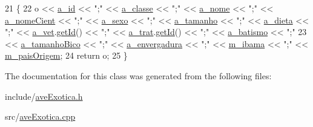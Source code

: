 \begin{DoxyCode}
21 \{
22     o << \hyperlink{classAnimal_a1eab12d1133a739dc0fea720cf6cc927}{a\_id} << \textcolor{stringliteral}{";"} << \hyperlink{classAnimal_a1f32b4455559489b5f5dce71913a6f8f}{a\_classe} << \textcolor{stringliteral}{";"} << \hyperlink{classAnimal_ad815bbe345d7c5274858ac8ccb24bc52}{a\_nome} << \textcolor{stringliteral}{";"} << 
      \hyperlink{classAnimal_af2ae0fc23b0eaf3edaee4579f6199dfc}{a\_nomeCient} << \textcolor{stringliteral}{";"} << \hyperlink{classAnimal_af2b1c520d145f82af7a5a88bb4271a0d}{a\_sexo} << \textcolor{stringliteral}{";"} << \hyperlink{classAnimal_a72366b060dfdbc0dd074fbe41decfcc2}{a\_tamanho} << \textcolor{stringliteral}{";"} << 
      \hyperlink{classAnimal_a32088524517a531af269e3ec04275135}{a\_dieta} << \textcolor{stringliteral}{";"} << \hyperlink{classAnimal_a12ce5681957e27dae674cbbde7fb1e4f}{a\_vet}.\hyperlink{classFuncionario_a0288286a907e587b7ab75d6c23354a06}{getId}() << \textcolor{stringliteral}{";"} << \hyperlink{classAnimal_a19fbf607b29b06a86f598dd1ffb8c712}{a\_trat}.\hyperlink{classFuncionario_a0288286a907e587b7ab75d6c23354a06}{getId}() << \textcolor{stringliteral}{";"} << 
      \hyperlink{classAnimal_a4e308163c5b3d82e546fb39b399bcb71}{a\_batismo} << \textcolor{stringliteral}{";"}
23     << \hyperlink{classAve_a4f544837b737e0a7984843033531f59f}{a\_tamanhoBico} << \textcolor{stringliteral}{";"} << \hyperlink{classAve_a755ef11f9c9bd778999b84856f42207d}{a\_envergadura} << \textcolor{stringliteral}{";"} << 
      \hyperlink{classAnimalSilvestre_a4c92c625318b23e550b8bb24fb934d14}{m\_ibama} << \textcolor{stringliteral}{";"} << \hyperlink{classExotico_a4ac7dec507f3420f4c96318c22ec6f36}{m\_paisOrigem};
24     \textcolor{keywordflow}{return} o;
25 \}\end{DoxyCode}


The documentation for this class was generated from the following files\+:\begin{DoxyCompactItemize}
\item 
include/\hyperlink{aveExotica_8h}{ave\+Exotica.\+h}\item 
src/\hyperlink{aveExotica_8cpp}{ave\+Exotica.\+cpp}\end{DoxyCompactItemize}
